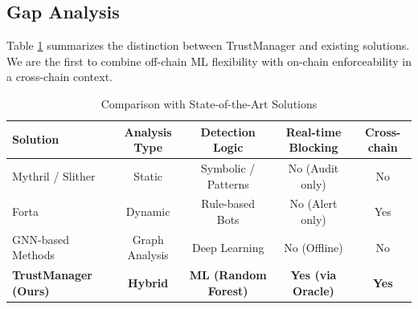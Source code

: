 \subsection{Gap Analysis}
Table \ref{tab:comparison} summarizes the distinction between TrustManager and existing solutions. We are the first to combine off-chain ML flexibility with on-chain enforceability in a cross-chain context.

\begin{table}[htbp]
\centering
\caption{Comparison with State-of-the-Art Solutions}
\label{tab:comparison}
\begin{tabular}{lcccc}
\toprule
\textbf{Solution} & \textbf{Analysis Type} & \textbf{Detection Logic} & \textbf{Real-time Blocking} & \textbf{Cross-chain} \\
\midrule
Mythril / Slither & Static & Symbolic / Patterns & No (Audit only) & No \\
Forta & Dynamic & Rule-based Bots & No (Alert only) & Yes \\
GNN-based Methods & Graph Analysis & Deep Learning & No (Offline) & No \\
\textbf{TrustManager (Ours)} & \textbf{Hybrid} & \textbf{ML (Random Forest)} & \textbf{Yes (via Oracle)} & \textbf{Yes} \\
\bottomrule
\end{tabular}
\end{table}
